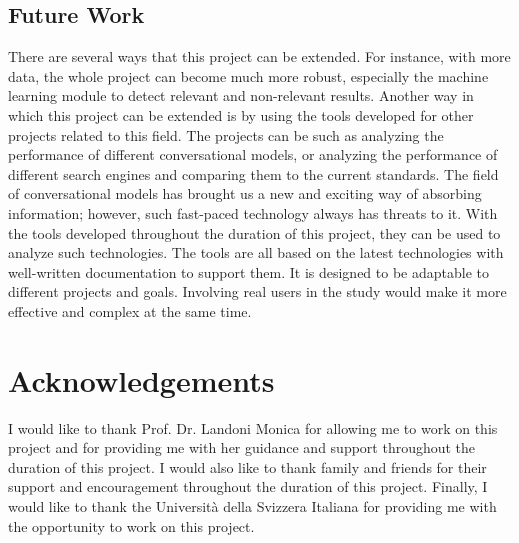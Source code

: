 \documentclass[50pt]{usiinfbachelorproject}
\begin{document}
\subsection{Future Work}
There are several ways that this project can be extended. For instance, with more data, the whole project can become much more robust, especially the machine learning module to detect relevant and non-relevant results. Another way in which this project can be extended is by using the tools developed for other projects related to this field. The projects can be such as analyzing the performance of different conversational models, or analyzing the performance of different search engines and comparing them to the current standards. The field of conversational models has brought us a new and exciting way of absorbing information; however, such fast-paced technology always has threats to it. With the tools developed throughout the duration of this project, they can be used to analyze such technologies. The tools are all based on the latest technologies with well-written documentation to support them. It is designed to be adaptable to different projects and goals. Involving real users in the study would make it more effective and complex at the same time.

\newpage
\section*{Acknowledgements}
I would like to thank Prof. Dr. Landoni Monica for allowing me to work on this project and for providing me with her guidance and support throughout the duration of this project. I would also like to thank family and friends for their support and encouragement throughout the duration of this project. Finally, I would like to thank the Università della Svizzera Italiana for providing me with the opportunity to work on this project.

\newpage


\end{document}
